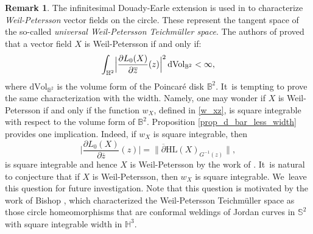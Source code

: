 \documentclass[11pt]{article}
\theoremstyle{plain}
\theoremstyle{definition}
\newtheorem{remark}[cor]{Remark}
\begin{document}
\begin{remark}\label{remark_weil_petersson}
The infinitesimal Douady-Earle extension is used in \cite{integral_operator_Zygmund} to characterize \emph{Weil-Petersson} vector fields on the circle. These represent the tangent space of the so-called \emph{universal Weil-Petersson Teichmüller space}. The authors of \cite{integral_operator_Zygmund} proved that a vector field $X$ is Weil-Petersson if and only if:
\[ \int_{\mathbb{H}^2} \Bigl|\frac{\partial L_0(X)}{\partial \overline{z}}(z)\Bigr| ^2 \, \mathrm{d}\mathrm{Vol}_{\mathbb{B}^2} <\infty,\] where $\mathrm{d}\mathrm{Vol}_{\mathbb{B}^2} $ is the volume form of the Poincaré disk $\mathbb{B}^2$. It~is tempting to prove the same characterization with the width. Namely, one may wonder if $X$ is Weil-Petersson if and only if the function $w_X$, defined in \eqref{w_xz}, is square integrable with respect to the volume form of $\mathbb{B}^2$. Proposition \ref{prop_d_bar_less_width} provides one implication. Indeed, if $w_X$ is square integrable, then
\[
\biggl|\frac{\partial L_0(X)}{\partial \overline{z}}(z)\biggr| =\rVert\overline{\partial}\mathrm{HL}(X)_{G^{-1}(z)}\lVert,
\]
is square integrable and hence $X$ is Weil-Petersson by the work of \cite{integral_operator_Zygmund}. It~is natural to conjecture that if $X$ is Weil-Petersson, then $w_X$ is square integrable. We~leave this question for future investigation. Note that this question is motivated by the work of Bishop \cite{bishop}, which characterized the Weil-Petersson Teichmüller space as those circle homeomorphisms that are conformal weldings of Jordan curves in $\mathbb{S}^2$ with square integrable width in $\mathbb{H}^3$.
\end{remark}

\end{document}
